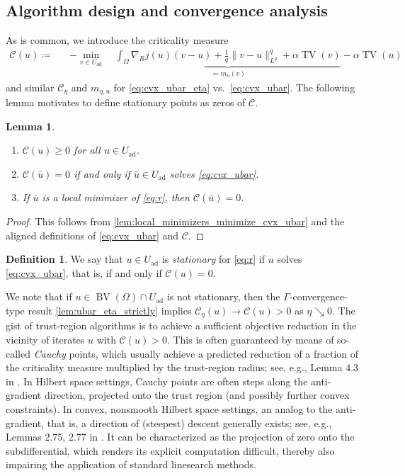 \documentclass[11pt]{article}
\newcommand{\calC}{\mathcal{C}}
\DeclareMathOperator*{\BV}{BV}
\DeclareMathOperator*{\TV}{TV}
\newcommand{\feas}{U_{\textrm{ad}}}
\newtheorem{lemma}[theorem]{Lemma}
\theoremstyle{definition}
\newtheorem{definition}[theorem]{Definition}
\theoremstyle{remark}
\begin{document}
\subsection{Algorithm design and convergence analysis}
%
As is common, we introduce the criticality measure
%
\[
\begin{aligned}
\calC(u) \coloneqq 
&&-\min_{v \in \feas}\ &\underbrace{\int_\Omega \nabla_R j(u) (v - u) + \frac{1}{q}\|v - u\|_{L^{q}}^{q}
+ \alpha\TV(v)}_{\eqqcolon m_{u}(v)} - \alpha\TV(u) 
\end{aligned}
\]
%
and similar $\calC_\eta$ and $m_{\eta,u}$ for \eqref{eq:cvx_ubar_eta} vs.\ \eqref{eq:cvx_ubar}. The
following lemma motivates to define stationary points as zeros of $\calC$.
%
\begin{lemma}
\begin{enumerate}
\item $\calC(u) \ge 0$ for all $u \in \feas$.
\item $\calC(\bar{u}) = 0$ if and only if $\bar{u} \in \feas$ solves \eqref{eq:cvx_ubar}.
\item If $\bar{u}$ is a local minimizer of \eqref{eq:r}, then $\calC(\bar{u}) = 0$.
\end{enumerate}
\end{lemma}
\begin{proof}
	This follows from \cref{lem:local_minimizers_minimize_cvx_ubar}
	and the aligned definitions of \eqref{eq:cvx_ubar} and $\calC$.
\end{proof}
%
\begin{definition}
We say that $u \in \feas$ is \emph{stationary} for \eqref{eq:r} if $u$ solves \eqref{eq:cvx_ubar},
that is, if and only if $\calC(u) = 0$.
\end{definition}
%
We note that if $u \in \BV(\Omega) \cap \feas$ is not stationary, then the $\Gamma$-convergence-type
result \cref{lem:ubar_eta_strictly} implies $\calC_\eta(u) \to \calC(u) > 0$ as $\eta \searrow 0$. The gist
of trust-region algorithms is to achieve a sufficient objective reduction in the vicinity of iterates $u$
with $\calC(u) > 0$. This is often guaranteed by means of so-called \emph{Cauchy} points, which usually
achieve a predicted reduction of a fraction of the criticality measure multiplied by the trust-region radius;
see, e.g., Lemma 4.3 in \cite{nocedal1999numerical}. In Hilbert space settings, Cauchy points are often steps
along the anti-gradient direction, projected onto the trust region (and possibly further convex constraints).
In convex, nonsmooth Hilbert space settings, an analog to the anti-gradient, that is, a direction of (steepest)
descent generally exists; see, e.g.,  Lemmas 2.75, 2.77 in \cite{ruszczynski2011nonlinear}. It can be
characterized as the projection of zero onto the subdifferential, which renders its explicit computation difficult,
thereby also impairing the application of standard linesearch methods.
\end{document}
